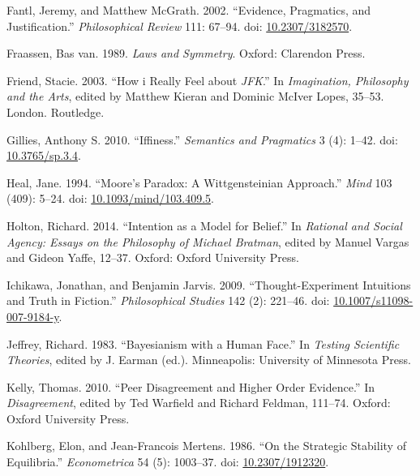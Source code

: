 \documentclass[
  11pt,
  letterpaper,
  DIV=11,
  numbers=noendperiod,
  twoside]{scrartcl}
\newlength{\cslhangindent}
\newenvironment{CSLReferences}[2] %
 {\begin{list}{}{%
  \setlength{\itemindent}{0pt}
  \setlength{\leftmargin}{0pt}
  \setlength{\parsep}{0pt}
  \ifodd #1
   \setlength{\leftmargin}{\cslhangindent}
   \setlength{\itemindent}{-1\cslhangindent}
  \fi
  \setlength{\itemsep}{#2\baselineskip}}}
 {\end{list}}
\begin{document}
\begin{CSLReferences}{1}{0}
Fantl, Jeremy, and Matthew McGrath. 2002. {``Evidence, Pragmatics, and
Justification.''} \emph{Philosophical Review} 111: 67--94. doi:
\href{https://doi.org/10.2307/3182570}{10.2307/3182570}.

Fraassen, Bas van. 1989. \emph{Laws and Symmetry}. Oxford: Clarendon
Press.

Friend, Stacie. 2003. {``How i Really Feel about \emph{JFK}.''} In
\emph{Imagination, Philosophy and the Arts}, edited by Matthew Kieran
and Dominic McIver Lopes, 35--53. London. Routledge.

Gillies, Anthony S. 2010. {``Iffiness.''} \emph{Semantics and
Pragmatics} 3 (4): 1--42. doi:
\href{https://doi.org/10.3765/sp.3.4}{10.3765/sp.3.4}.

Heal, Jane. 1994. {``Moore's Paradox: A Wittgensteinian Approach.''}
\emph{Mind} 103 (409): 5--24. doi:
\href{https://doi.org/10.1093/mind/103.409.5}{10.1093/mind/103.409.5}.

Holton, Richard. 2014. {``Intention as a Model for Belief.''} In
\emph{Rational and Social Agency: Essays on the Philosophy of Michael
Bratman}, edited by Manuel Vargas and Gideon Yaffe, 12--37. Oxford:
Oxford University Press.

Ichikawa, Jonathan, and Benjamin Jarvis. 2009. {``Thought-Experiment
Intuitions and Truth in Fiction.''} \emph{Philosophical Studies} 142
(2): 221--46. doi:
\href{https://doi.org/10.1007/s11098-007-9184-y}{10.1007/s11098-007-9184-y}.

Jeffrey, Richard. 1983. {``Bayesianism with a Human Face.''} In
\emph{Testing Scientific Theories}, edited by J. Earman (ed.).
Minneapolis: University of Minnesota Press.

Kelly, Thomas. 2010. {``Peer Disagreement and Higher Order Evidence.''}
In \emph{Disagreement}, edited by Ted Warfield and Richard Feldman,
111--74. Oxford: Oxford University Press.

Kohlberg, Elon, and Jean-Francois Mertens. 1986. {``On the Strategic
Stability of Equilibria.''} \emph{Econometrica} 54 (5): 1003--37. doi:
\href{https://doi.org/10.2307/1912320}{10.2307/1912320}.


\end{CSLReferences}
\end{document}
